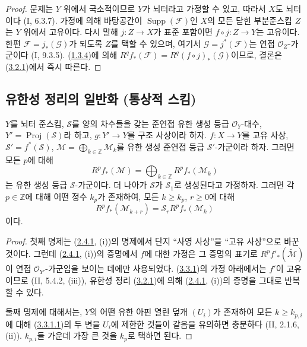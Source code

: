 \begin{proof}
문제는 $Y$ 위에서 국소적이므로 $Y$가 뇌터라고 가정할 수 있고,
따라서 $X$도 뇌터이다 (I, 6.3.7). 가정에 의해 바탕공간이
$\operatorname{Supp}(\mathcal F)$인 $X$의 모든 닫힌 부분준스킴
$Z$는 $Y$ 위에서 고유이다. 다시 말해 $j:Z\to X$가 표준 포함이면
$f\circ j:Z\to Y$는 고유이다. 한편
$\mathcal F=j_*(\mathcal G)$가 되도록 $Z$를 택할 수 있으며, 여기서
$\mathcal G=j^*(\mathcal F)$는 연접 $\mathcal O_Z$-가군이다
(I, 9.3.5). (\hyperref[III.1.3.4-fr]{1.3.4})에 의해
$R^qf_*(\mathcal F)=R^q(f\circ j)_*(\mathcal G)$이므로, 결론은
(\hyperref[III.3.2.1-fr]{3.2.1})에서 즉시 따른다.
\end{proof}

\subsection{유한성 정리의 일반화 (통상적 스킴)}
\label{subsection:III.3.3-fr}

\begin{proposition}[3.3.1]
\label{III.3.3.1-fr}
$Y$를 뇌터 준스킴, $\mathcal S$를 양의 차수들을 갖는 준연접 유한
생성 등급 $\mathcal O_Y$-대수,
$Y'=\operatorname{Proj}(\mathcal S)$라 하고, $g:Y'\to Y$를 구조
사상이라 하자. $f:X\to Y$를 고유 사상,
$\mathcal S'=f^*(\mathcal S)$,
$\mathcal M=\bigoplus_{k\in\mathbb Z}\mathcal M_k$를 유한 생성 준연접
등급 $\mathcal S'$-가군이라 하자. 그러면 모든 $p$에 대해
\[
R^pf_*(\mathcal M)=\bigoplus_{k\in\mathbb Z}R^pf_*(\mathcal M_k)
\]
는 유한 생성 등급 $\mathcal S$-가군이다. 더 나아가 $\mathcal S$가
$\mathcal S_1$로 생성된다고 가정하자. 그러면 각 $p\in\mathbb Z$에
대해 어떤 정수 $k_p$가 존재하여, 모든 $k\geq k_p$, $r\geq0$에 대해
\[
R^pf_*(\mathcal M_{k+r})=\mathcal S_rR^pf_*(\mathcal M_k)
\tag{3.3.1.1}\label{III.3.3.1.1-fr}
\]
이다.
\end{proposition}

\begin{proof}
첫째 명제는 (\hyperref[III.2.4.1-fr]{2.4.1}, (i))의 명제에서 단지
``사영 사상''을 ``고유 사상''으로 바꾼 것이다. 그런데
(\hyperref[III.2.4.1-fr]{2.4.1}, (i))의 증명에서 $f$에 대한 가정은
그 증명의 표기로 $R^pf'_*(\widetilde{\mathcal M})$이 연접
$\mathcal O_{Y'}$-가군임을 보이는 데에만 사용되었다.
(\hyperref[III.3.3.1-fr]{3.3.1})의 가정 아래에서는 $f'$이 고유이므로
(II, 5.4.2, (iii)), 유한성 정리
(\hyperref[III.3.2.1-fr]{3.2.1})에 의해
(\hyperref[III.2.4.1-fr]{2.4.1}, (i))의 증명을 그대로 반복할 수 있다.

둘째 명제에 대해서는, $Y$의 어떤 유한 아핀 열린 덮개 $(U_i)$가
존재하여 모든 $k\geq k_{p,i}$에 대해
(\hyperref[III.3.3.1.1-fr]{3.3.1.1})의 두 변을 $U_i$에 제한한 것들이
같음을 유의하면 충분하다 (II, 2.1.6, (ii)). $k_{p,i}$들 가운데 가장
큰 것을 $k_p$로 택하면 된다.
\end{proof}

